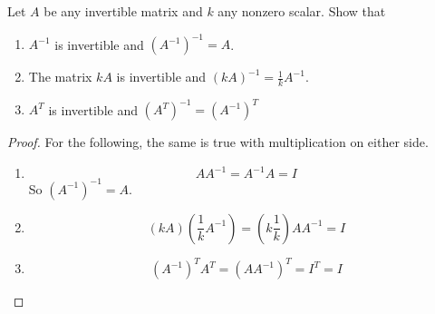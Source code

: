 \begin{problem} \label{P.1.14}
    Let \( A \) be any invertible matrix and \( k \) any nonzero scalar. Show that
    \begin{enumerate}
    
        \item \( A^{-1} \) is invertible and \( (A^{-1})^{-1} = A \).
        
        \item The matrix \( kA \) is invertible and \( (kA)^{-1} = \frac{1}{k}A^{-1} \).
        
        \item \( A^T \) is invertible and \( (A^T)^{-1} = (A^{-1})^{T}\) 
    \end{enumerate}
    
    \begin{proof}
        For the following, the same is true with multiplication on either side.
        \begin{enumerate}
            \item 
            \[
            AA^{-1} = A^{-1}A = I
            \]
            So \( (A^{-1})^{-1} = A \).
            
            \item 
            \[
            (kA)\left(\frac{1}{k}A^{-1}\right) = \left(k\frac{1}{k}\right) AA^{-1} = I
            \]
            
            \item 
            \[
            (A^{-1})^TA^T = (AA^{-1})^T = I^T = I
            \]
        \end{enumerate}
    \end{proof}
\end{problem}


